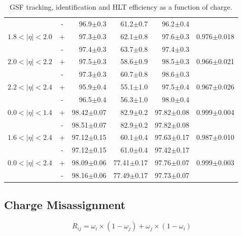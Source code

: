 \begin{table}[htb]
\begin{center}
\begin{tabular}{lcrrrr}
                   &-& 96.9$\pm$0.3 &61.2$\pm$0.7 &96.2$\pm$0.4 & \\
$1.8<| \eta |<2.0$ &+& 97.3$\pm$0.3 &62.1$\pm$0.8 &97.6$\pm$0.3 & 0.976$\pm$0.018\\
                   &-& 97.4$\pm$0.3 &63.7$\pm$0.8 &97.4$\pm$0.3 & \\
$2.0<| \eta |<2.2$ &+& 97.5$\pm$0.3 &58.6$\pm$0.9 &98.5$\pm$0.3 & 0.966$\pm$0.021\\
                   &-& 97.3$\pm$0.3 &60.7$\pm$0.8 &98.6$\pm$0.3 & \\
$2.2<| \eta |<2.4$ &+& 95.9$\pm$0.4 &55.1$\pm$1.0 &97.5$\pm$0.4 & 0.967$\pm$0.026\\
                   &-& 96.5$\pm$0.4 &56.3$\pm$1.0 &98.0$\pm$0.4 & \\

\hline
$0.0<| \eta |<1.4$ &+& 98.42$\pm$0.07 &82.9$\pm$0.2 &97.82$\pm$0.08 & 0.999$\pm$0.004\\
                   &-& 98.51$\pm$0.07 &82.9$\pm$0.2 &97.82$\pm$0.08 & \\
$1.6<| \eta |<2.4$ &+& 97.12$\pm$0.15 &60.1$\pm$0.4 &97.63$\pm$0.17 & 0.987$\pm$0.010\\
                   &-& 97.12$\pm$0.15 &61.0$\pm$0.4 &97.42$\pm$0.17 & \\
\hline
$0.0<| \eta |<2.4$ &+& 98.09$\pm$0.06 &77.41$\pm$0.17 &97.76$\pm$0.07 & 0.999$\pm$0.003\\
                   &-& 98.16$\pm$0.06 &77.49$\pm$0.17 &97.73$\pm$0.07 & \\
\end{tabular}
\end{center}
\caption{\label{tab:efficiency} GSF tracking, identification and HLT efficiency as a function of charge.}
\end{table}

\subsection{Charge Misassignment}
\begin{equation}
R_{ij}=\omega_i \times(1-\omega_j) + \omega_j \times(1-\omega_i)
\end{equation}

